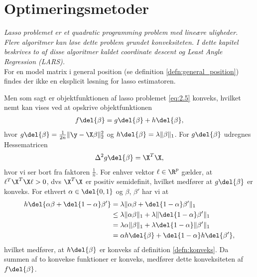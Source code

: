 \chapter{Optimeringsmetoder} \label{kap:optimeringsmetoder}
\textit{Lasso problemet er et quadratic programming problem med lineære uligheder. 
Flere algoritmer kan løse dette problem grundet konveksiteten.  
I dette kapitel beskrives to af disse algoritmer kaldet coordinate descent og Least Angle Regression (LARS).} \\[4mm]
%
For en model matrix i general position (se definition \ref{defn:general_position}) findes der ikke en eksplicit løsning for lasso estimatoren.

Men som sagt er objektfunktionen af lasso problemet \eqref{eq:2.5} konveks, hvilket nemt kan vises ved at opskrive objektfunktionen
\begin{align}
f \del{\beta} = g \del{\beta} + h \del{\beta}, \label{eq:opdeling_fkt}
\end{align}
hvor \(g \del{\beta} = \frac{1}{2n} \Vert \y - \X \beta \Vert_2^2\) og \(h \del{\beta} = \lambda \Vert \beta \Vert_1\).
For \(g \del{\beta}\) udregnes Hessematricen
\begin{align*}
\Delta^2 g \del{\beta} = \X^T \X,
\end{align*}
hvor vi ser bort fra faktoren \(\frac{1}{n}\). 
For enhver vektor \(\ell \in \R^p\) gælder, at \(\ell^T \X^T \X \ell > 0\), dvs \( \X^T \X \) er positiv semidefinit, hvilket medfører at \(g \del{\beta}\) er konveks.
For ethvert \(\alpha \in \del{0,1}\) og \(\beta\), \(\beta'\) har vi at
\begin{align*}
h \del{\alpha \beta + \del{1-\alpha}\beta'} &= \lambda \Vert \alpha \beta + \del{1-\alpha} \beta' \Vert_1 \\
&\leq \lambda \Vert \alpha \beta \Vert_1 + \lambda \Vert \del{1-\alpha} \beta' \Vert_1 \\
&= \lambda \alpha \Vert \beta \Vert_1 + \lambda \del{1-\alpha} \Vert \beta' \Vert_1 \\
&= \alpha h \del{\beta} + \del{1-\alpha} h \del{\beta'},
\end{align*}
hvilket medfører, at \(h \del{\beta}\) er konveks af definition \ref{defn:konveks}.
Da summen af to konvekse funktioner er konveks, medfører dette konveksiteten af \(f \del{\beta}\). 

